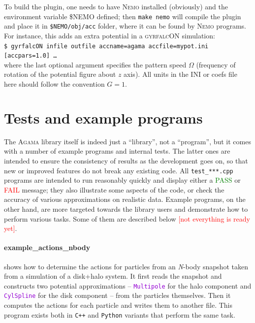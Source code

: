 \documentclass[12pt]{article}
\newcommand{\Agama}{\textsc{Agama}\xspace}
\newcommand{\Nemo} {\textsc{Nemo}\xspace}
\newcommand{\Nbody}{\textsl{N}-body\xspace}
\newcommand{\Cpp}  {\texttt{C++}\xspace}
\newcommand{\Python}{\texttt{Python}\xspace}
\newcommand{\ttt}[1]{\textcolor{darkviolet}{\texttt{#1}}}
\begin{document}
To build the plugin, one needs to have \Nemo installed (obviously) and the environment variable \$NEMO defined; then \texttt{make nemo} will compile the plugin and place it in \texttt{\$NEMO/obj/acc} folder, where it can be found by \Nemo programs. For instance, this adds an extra potential in a \textsc{gyrfalcON}  simulation:\\
\texttt{\$ gyrfalcON infile outfile accname=agama accfile=mypot.ini [accpars=1.0] \dots}\\
where the last optional argument specifies the pattern speed $\Omega$ (frequency of rotation of the potential figure about $z$ axis). All units in the INI or coefs file here should follow the convention $G=1$.


\section{Tests and example programs}  \label{sec:ExamplesTests}

The \Agama library itself is indeed just a ``library'', not a ``program'', but it comes with a number of example programs and internal tests. The latter ones are intended to ensure the consistency of results as the development goes on, so that new or improved features do not break any existing code. All \texttt{test_***.cpp} programs are intended to run reasonably quickly and display either a \textcolor{Green}{PASS} or \textcolor{Red}{FAIL} message; they also illustrate some aspects of the code, or check the accuracy of various approximations on realistic data. Example programs, on the other hand, are more targeted towards the library users and demonstrate how to perform various tasks. Some of them are described below \textcolor{red}{[not everything is ready yet]}.

\paragraph{example_actions_nbody} shows how to determine the actions for particles from an \Nbody snapshot taken from a simulation of a disk+halo system. It first reads the snapshot and constructs two potential approximations -- \ttt{Multipole} for the halo component and \ttt{CylSpline} for the disk component -- from the particles themselves. Then it computes the actions for each particle and writes them to another file. This program exists both in \Cpp and \Python variants that perform the same task.
\end{document}
